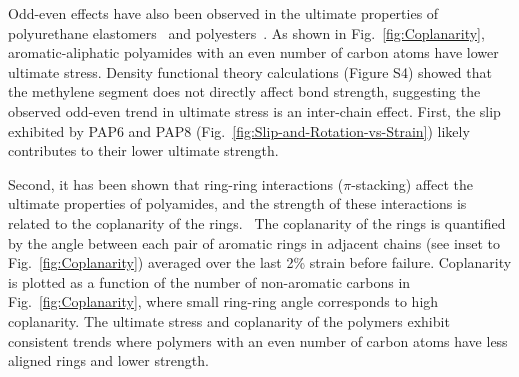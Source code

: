 \documentclass[journal=langd5,manuscript=article]{achemso}
\begin{document}
\FloatBarrier

Odd-even effects have also been observed in the ultimate properties of polyurethane
elastomers~\cite{prisacariu2011influence} and polyesters~\cite{shen2017facile}.
As shown in Fig.~\ref{fig:Coplanarity}, aromatic-aliphatic polyamides with an even number of carbon atoms have lower ultimate stress.
Density functional theory calculations (Figure S4) showed that the methylene segment does not directly affect bond strength, suggesting the observed odd-even trend in ultimate stress is an inter-chain effect.
First, the slip exhibited by PAP6 and PAP8 (Fig.~\ref{fig:Slip-and-Rotation-vs-Strain}) likely contributes to their lower ultimate strength.


Second, it has been shown that ring-ring interactions ($\pi$-stacking) affect the ultimate properties of polyamides, and the strength of these interactions is related to the coplanarity of the rings.~\cite{yang2021molecular,burattini2011supramolecular}
The coplanarity of the rings is quantified by the angle between each pair of aromatic rings in adjacent chains (see inset to Fig.~\ref{fig:Coplanarity}) averaged over the last 2\% strain before failure. 
Coplanarity is plotted as a function of the number of non-aromatic carbons in Fig.~\ref{fig:Coplanarity}, where small ring-ring angle corresponds to high coplanarity.
The ultimate stress and coplanarity of the polymers exhibit consistent trends where polymers with an even number of carbon atoms have less aligned rings and lower strength.
\end{document}
